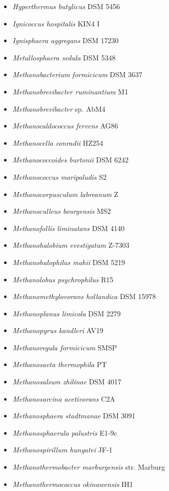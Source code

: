 \begin{itemize}
    \item \textit{Hyperthermus butylicus} DSM 5456
    \item \textit{Ignicoccus hospitalis} KIN4 I
    \item \textit{Ignisphaera aggregans} DSM 17230
    \item \textit{Metallosphaera sedula} DSM 5348
    \item \textit{Methanobacterium formicicum} DSM 3637
    \item \textit{Methanobrevibacter ruminantium} M1
    \item \textit{Methanobrevibacter} sp. AbM4
    \item \textit{Methanocaldococcus fervens} AG86
    \item \textit{Methanocella conradii} HZ254
    \item \textit{Methanococcoides burtonii} DSM 6242
    \item \textit{Methanococcus maripaludis} S2
    \item \textit{Methanocorpusculum labreanum} Z
    \item \textit{Methanoculleus bourgensis} MS2
    \item \textit{Methanofollis liminatans} DSM 4140
    \item \textit{Methanohalobium evestigatum} Z-7303
    \item \textit{Methanohalophilus mahii} DSM 5219
    \item \textit{Methanolobus psychrophilus} R15
    \item \textit{Methanomethylovorans hollandica} DSM 15978
    \item \textit{Methanoplanus limicola} DSM 2279
    \item \textit{Methanopyrus kandleri} AV19
    \item \textit{Methanoregula formicicum} SMSP
    \item \textit{Methanosaeta thermophila} PT
    \item \textit{Methanosalsum zhilinae} DSM 4017
    \item \textit{Methanosarcina acetivorans} C2A
    \item \textit{Methanosphaera stadtmanae} DSM 3091
    \item \textit{Methanosphaerula palustris} E1-9c
    \item \textit{Methanospirillum hungatei} JF-1
    \item \textit{Methanothermobacter marburgensis} str. Marburg
    \item \textit{Methanothermococcus okinawensis} IH1

\end{itemize}
